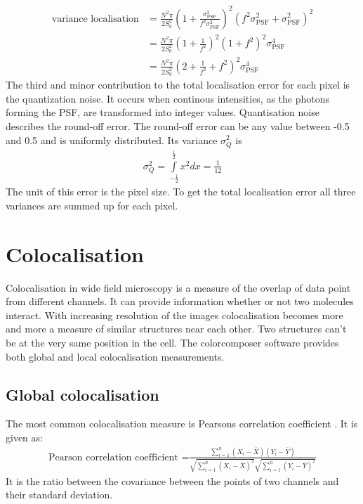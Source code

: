 \begin{align}
 \text{variance localisation} &= \frac{N^2\pi}{2S_0^2} \left(1+\frac{\sigma_\text{PSF}^2}{f^2\sigma_\text{PSF}^2}\right)^2\left(f^2\sigma_\text{PSF}^2+\sigma_\text{PSF}^2\right)^2 \\
 &=\frac{N^2\pi}{2S_0^2}\left(1+\frac{1}{f^2}\right)^2\left(1+f^2\right)^2\sigma_\text{PSF}^4\\
 &= \frac{N^2\pi}{2S_0^2}\left(2+\frac{1}{f^2}+f^2\right)^2\sigma_\text{PSF}^4
\end{align}
The third and minor contribution to the total localisation error for each pixel is the quantization noise. It occurs when continous intensities, as the photons forming the PSF, are transformed into integer values. Quantisation noise describes the round-off error. The round-off error can be any value between -0.5 and 0.5 and is uniformly distributed. Its variance $\sigma_Q^2$ is
\begin{align}
 \sigma_Q^2 =\int\limits_{-\frac{1}{2}}^{\frac{1}{2}} x^2 dx = \frac{1}{12}
\end{align}
The unit of this error is the pixel size.\newline
To get the total localisation error all three variances are summed up for each pixel.

\section{Colocalisation}
Colocalisation in wide field microscopy is a measure of the overlap of data point from different channels. It can provide information whether or not two molecules interact. With increasing resolution of the images colocalisation becomes more and more a measure of similar structures near each other. Two structures can't be at the very same position in the cell. The colorcomposer software provides both global and local colocalisation measurements.
\subsection{Global colocalisation}
The most common colocalisation measure is Pearsons correlation coefficient \cite{pearson}. It is given as:
\begin{align}
\text{Pearson correlation coefficient =}\frac{\sum ^n _{i=1}(X_i - \bar{X})(Y_i - \bar{Y})}{\sqrt{\sum ^n _{i=1}(X_i - \bar{X})^2} \sqrt{\sum ^n _{i=1}(Y_i - \bar{Y})^2}}
\end{align}
It is the ratio between the covariance between the points of two channels and their standard deviation.\newline


